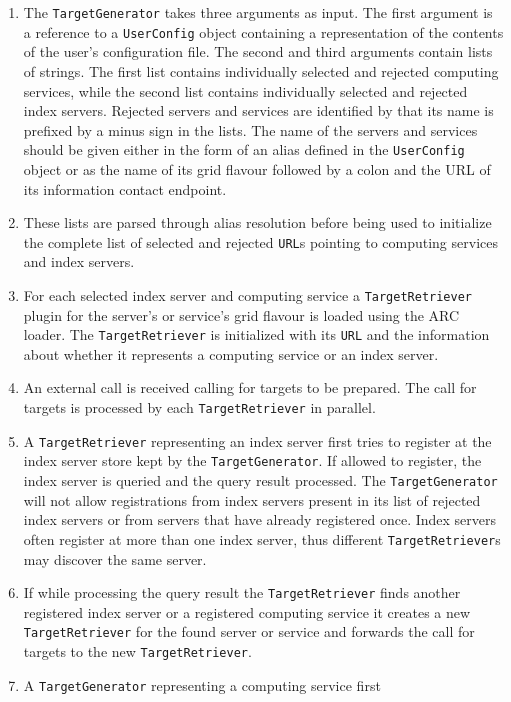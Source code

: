 \documentclass{book}
\newcommand{\TargetGenerator}{\texttt{TargetGenerator}}
\newcommand{\TargetRetriever}{\texttt{TargetRetriever}}
\newcommand{\URL}{\texttt{URL}}
\newcommand{\UserConfig}{\texttt{UserConfig}}
\begin{document}
\begin{enumerate}
\item{The {\TargetGenerator} takes three arguments as input. The first
  argument is a reference to a {\UserConfig} object containing a
  representation of the contents of the user's configuration file. The
  second and third arguments contain lists of strings. The first list
  contains individually selected and rejected computing services,
  while the second list contains individually selected and rejected
  index servers. Rejected servers and services are identified by that
  its name is prefixed by a minus sign in the lists. The name of the
  servers and services should be given either in the form of an alias
  defined in the {\UserConfig} object or as the name of its grid
  flavour followed by a colon and the URL of its information contact
  endpoint.}
\item{These lists are parsed through alias resolution before being
  used to initialize the complete list of selected and rejected
  {\URL}s pointing to computing services and index servers.}
\item{For each selected index server and computing service a
  {\TargetRetriever} plugin for the server's or service's grid flavour
  is loaded using the ARC loader. The {\TargetRetriever} is
  initialized with its {\URL} and the information about whether it
  represents a computing service or an index server.}
\item{An external call is received calling for targets to be
  prepared. The call for targets is processed by each
  {\TargetRetriever} in parallel.}
\item{A {\TargetRetriever} representing an index server first tries to
  register at the index server store kept by the {\TargetGenerator}.
  If allowed to register, the index server is queried and the query
  result processed. The {\TargetGenerator} will not allow
  registrations from index servers present in its list of rejected
  index servers or from servers that have already registered
  once. Index servers often register at more than one index server,
  thus different {\TargetRetriever}s may discover the same server.}
\item{If while processing the query result the {\TargetRetriever}
  finds another registered index server or a registered computing
  service it creates a new {\TargetRetriever} for the found server or
  service and forwards the call for targets to the new
  {\TargetRetriever}.}
\item{A {\TargetGenerator} representing a computing service first
}
\end{enumerate}
\end{document}
